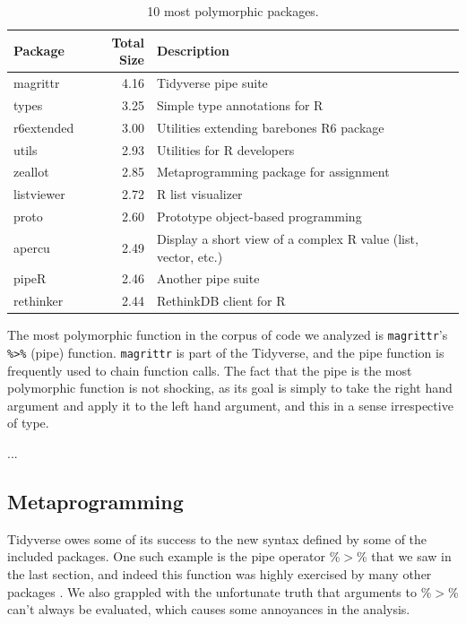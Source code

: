 \documentclass[acmsmall,10pt,review,anonymous]{acmart}\settopmatter{printfolios=true,printccs=false,printacmref=false}
\begin{document}
\begin{table}[ht]
\label{tab:packagepolysize}
\centering
\begin{tabular}{lrl}
  \hline
Package & Total Size & Description \\
  \hline
  magrittr & 4.16 & Tidyverse pipe suite \\
  types & 3.25 & Simple type annotations for R \\
  r6extended & 3.00 & Utilities extending barebones R6 package \\
  utils & 2.93 & Utilities for R developers \\
  zeallot & 2.85 & Metaprogramming package for assignment \\
  listviewer & 2.72 & R list visualizer \\
  proto & 2.60 & Prototype object-based programming \\
  apercu & 2.49 & Display a short view of a complex R value (list, vector, etc.) \\
  pipeR & 2.46 & Another pipe suite \\
  rethinker & 2.44 & RethinkDB client for R \\
   \hline
\end{tabular}
\caption{10 most polymorphic packages.}
\end{table}




The most polymorphic function in the corpus of code we analyzed is {\tt magrittr}'s {\tt \%>\%} (pipe) function.
{\tt magrittr} is part of the Tidyverse, and the pipe function is frequently used to chain function calls.
The fact that the pipe is the most polymorphic function is not shocking, as its goal is simply to take the right hand argument and apply it to the left hand argument, and this in a sense irrespective of type.

...

%
%
%
%
\subsection{Metaprogramming}


Tidyverse owes some of its success to the new syntax defined by some of the included packages.
One such example is the pipe operator \%$>$\% that we saw in the last section, and indeed this function was highly exercised by many other packages .
We also grappled with the unfortunate truth that arguments to \%$>$\% can't always be evaluated, which causes some annoyances in the analysis.
\end{document}
